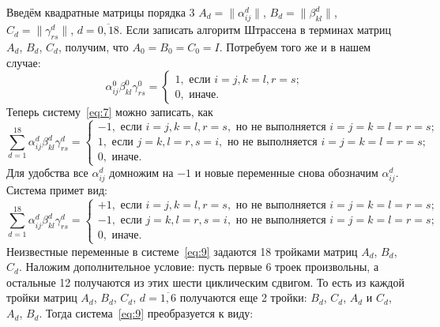 \documentclass[12pt]{article}
\begin{document}
    Введём квадратные матрицы порядка $ 3 $ $ A_d=\| \alpha_{ij}^d\| $, $ B_d=\| \beta_{kl}^d\| $, $ C_d=\| \gamma_{rs}^d\| $,
    $ d = \overline{0,18} $.
    Если записать алгоритм Штрассена в терминах матриц $ A_d $, $ B_d $, $ C_d $, получим, что $ A_0 = B_0 = C_0 = I $.
    Потребуем того же и в нашем случае:
    \begin{equation*}
        \alpha^0_{ij} \beta^0_{kl} \gamma^0_{rs} =
        \begin{cases}
            1, \text{ если } i = j, k = l, r = s;\\
            0, \text{ иначе.}
        \end{cases}
    \end{equation*}
    Теперь систему~\eqref{eq:7} можно записать, как
    \begin{equation}
        \sum_{d=1}^{18} \alpha^d_{ij} \beta^d_{kl} \gamma^d_{rs} =
        \begin{cases}
            -1, \text{ если } i = j, k = l, r = s,  \text{ но не выполняется } i=j=k=l=r=s;\\
            1, \text{ если } j = k, l = r, s = i,  \text{ но не выполняется } i=j=k=l=r=s;\\
            0, \text{ иначе.}
        \end{cases}\label{eq:8}
    \end{equation}
    Для удобства все  $ \alpha^d_{ij} $ домножим на $ -1 $ и новые переменные снова обозначим  $\alpha^d_{ij}$.
    Система примет вид:
    \begin{equation}
        \sum_{d=1}^{18} \alpha^d_{ij} \beta^d_{kl} \gamma^d_{rs}=
        \begin{cases}
            +1, \text{ если } i = j, k = l, r = s,  \text{ но не выполняется } i = j = k = l = r = s;\\
            -1, \text{ если } j = k, l = r, s = i,  \text{ но не выполняется } i = j = k = l = r = s;\\
            0, \text{ иначе.}
        \end{cases}\label{eq:9}
    \end{equation}
    Неизвестные переменные в системе~\eqref{eq:9} задаются 18 тройками матриц $ A_d $, $ B_d $, $ C_d $.
    Наложим дополнительное условие: пусть первые 6 троек произвольны, а остальные 12 получаются из этих шести
    циклическим сдвигом.
    То есть из каждой тройки матриц $ A_d $, $ B_d $, $ C_d $, $ d=\overline{1,6} $
    получаются еще 2 тройки: $ B_d $, $ C_d $, $ A_d $ и $ C_d $, $ A_d $, $ B_d $.
    Тогда система~\eqref{eq:9} преобразуется к виду:
\end{document}
